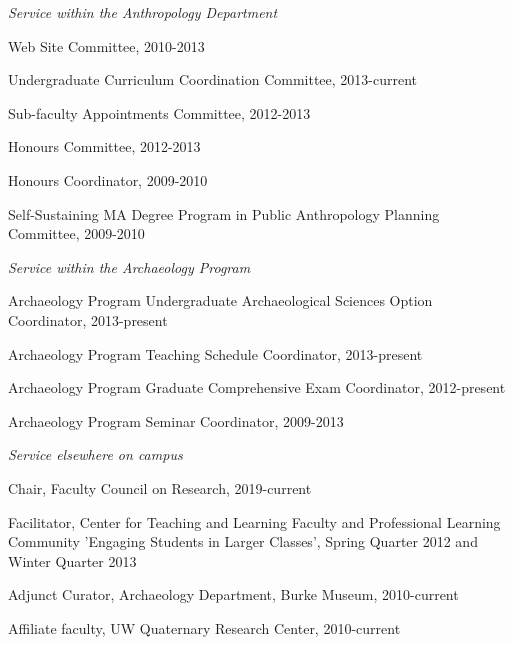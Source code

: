 
\medskip

\noindent\emph{Service within the Anthropology Department \vspace{0.01in}}

\medskip

\ind Web Site Committee, 2010-2013

\ind Undergraduate Curriculum Coordination Committee, 2013-current

\ind Sub-faculty Appointments Committee, 2012-2013

\ind Honours Committee, 2012-2013

\ind Honours Coordinator, 2009-2010

\ind Self-Sustaining MA Degree Program in Public Anthropology Planning Committee, 2009-2010

\medskip

\noindent\emph{Service within the Archaeology Program \vspace{0.01in}}

\medskip

\ind Archaeology Program Undergraduate Archaeological Sciences Option Coordinator, 2013-present

\ind Archaeology Program Teaching Schedule Coordinator, 2013-present

\ind Archaeology Program Graduate Comprehensive Exam Coordinator, 2012-present

\ind Archaeology Program Seminar Coordinator, 2009-2013

 \medskip
 
 \newpage

\noindent\emph{Service elsewhere on campus\vspace{0.01in}}

\medskip

\ind Chair, Faculty Council on Research, 2019-current

\ind Facilitator, Center for Teaching and Learning Faculty and Professional Learning Community 'Engaging Students in Larger Classes', Spring Quarter 2012 and Winter Quarter 2013

\ind Adjunct Curator, Archaeology Department, Burke Museum, 2010-current

\ind Affiliate faculty, UW Quaternary Research Center, 2010-current

